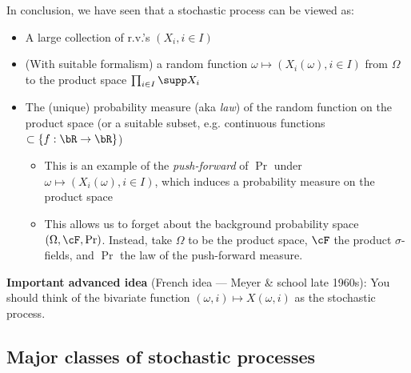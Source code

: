 In conclusion, we have seen that a stochastic process can be viewed as:
\begin{itemize}
  \item A large collection of r.v.'s $(X_i, i \in I)$
  \item (With suitable formalism) a random function
    $\omega \mapsto (X_i(\omega), i \in I)$ from $\Omega$
    to the product space $\prod_{i \in I} \supp X_i$
  \item The (unique) probability measure (aka \emph{law}) of the random
    function on the product space (or a suitable subset,
    e.g. continuous functions $\subset \{ f : \bR \to \bR \}$)
    \begin{itemize}
      \item This is an example of the \emph{push-forward} of $\Pr$
        under $\omega \mapsto (X_i(\omega), i \in I)$, which induces a
        probability measure on the product space
      \item This allows us to forget about the background
        probability space $(\Omega, \cF, \Pr)$. Instead, take $\Omega$ to be
        the product space, $\cF$ the product $\sigma$-fields, and $\Pr$ the law
        of the push-forward measure.
    \end{itemize}
\end{itemize}

\textbf{Important advanced idea} (French idea --- Meyer \& school late 1960s):
You should think of the bivariate function $(\omega, i) \mapsto X(\omega, i)$
as the stochastic process.

\subsection{Major classes of stochastic processes}

